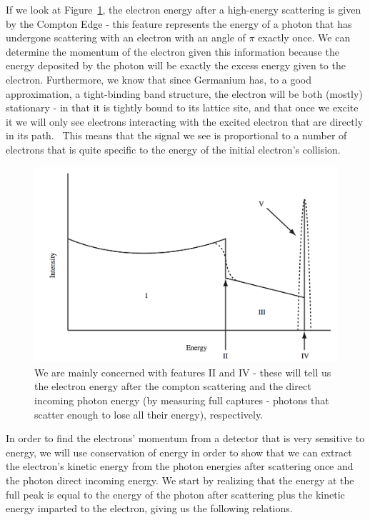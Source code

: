\documentclass[reprint, nobibnotes, amssymb, amsmath, amsfonts, physics, mathtools, mathrsfs, floatfix]{revtex4-1}
\begin{document}
    If we look at Figure~\ref{fig:labeled_spectrum}, the electron energy after a high-energy scattering is given by the Compton Edge - this feature represents the energy of a photon that has undergone scattering with an electron with an angle of $\pi$ exactly once.  We can determine the momentum of the electron given this information because the energy deposited by the photon will be exactly the excess energy given to the electron.  Furthermore, we know that since Germanium has, to a good approximation, a tight-binding band structure, the electron will be both (mostly) stationary - in that it is tightly bound to its lattice site, and that once we excite it we will only see electrons interacting with the excited electron that are directly in its path.~\cite{germanium_structure}  This means that the signal we see is proportional to a number of electrons that is quite specific to the energy of the initial electron's collision.

    \begin{figure}[h]
      \centering
      \includegraphics[width=\linewidth]{energy_spectrum.png}
      \caption{We are mainly concerned with features II and IV - these will tell us the electron energy after the compton scattering and the direct incoming photon energy (by measuring full captures - photons that scatter enough to lose all their energy), respectively.~\cite{lab_manual} \label{fig:labeled_spectrum}}
    \end{figure}

    In order to find the electrons' momentum from a detector that is very sensitive to energy, we will use conservation of energy in order to show that we can extract the electron's kinetic energy from the photon energies after scattering once and the photon direct incoming energy.  We start by realizing that the energy at the full peak is equal to the energy of the photon after scattering plus the kinetic energy imparted to the electron, giving us the following relations.
\end{document}

